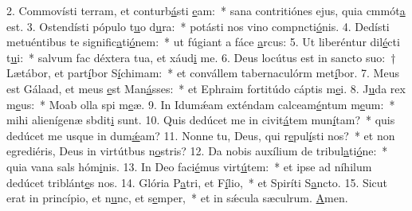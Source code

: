 2. Commovísti terram, et conturb\uline{á}sti \uline{e}am:~* sana contritiónes ejus, quia cmmót\uline{a} est.
3. Ostendísti pópulo t\uline{u}o d\uline{u}ra:~* potásti nos vino compncti\uline{ó}nis.
4. Dedísti metuéntibus te signific\uline{a}ti\uline{ó}nem:~* ut fúgiant a fáce \uline{a}rcus:
5. Ut liberéntur dil\uline{é}cti t\uline{u}i:~* salvum fac déxtera tua, et xáud\uline{i} me.
6. Deus locútus est in sancto suo:~† Lætábor, et part\uline{í}bor S\uline{í}chimam:~* et convállem tabernaculórm met\uline{í}bor.
7. Meus est Gálaad, et meus \uline{e}st Man\uline{á}sses:~* et Ephraim fortitúdo cáptis m\uline{e}i.
8. J\uline{u}da rex m\uline{e}us:~* Moab olla spi m\uline{e}æ.
9. In Idumǽam exténdam calceam\uline{é}ntum m\uline{e}um:~* mihi alienígenæ sbdit\uline{i} sunt.
10. Quis dedúcet me in civit\uline{á}tem mun\uline{í}tam?~* quis dedúcet me usque in dum\uline{ǽ}am?
11. Nonne tu, Deus, qui r\uline{e}pul\uline{í}sti nos?~* et non egrediéris, Deus in virtútbus n\uline{o}stris?
12. Da nobis auxílium de tribul\uline{a}ti\uline{ó}ne:~* quia vana sals hóm\uline{i}nis.
13. In Deo faci\uline{é}mus virt\uline{ú}tem:~* et ipse ad níhilum dedúcet triblánt\uline{e}s nos.
14. Glória P\uline{a}tri, et F\uline{í}lio,~* et Spiríti S\uline{a}ncto.
15. Sicut erat in princípio, et n\uline{u}nc, et s\uline{e}mper,~* et in sǽcula sæculrum. \uline{A}men.
